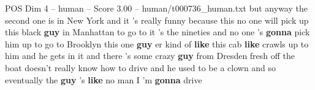 \begin{textsample}{POS Dim 4 – human – Score 3.00 – human/t000736\_human.txt}  \label{ex:f4_pos_016}
but anyway the second one is in New York and it 's really funny because this no one will pick up this black \textbf{guy} in Manhattan to go to it 's the nineties and no one 's \textbf{gonna} pick him up to go to Brooklyn this one \textbf{guy} er kind of \textbf{like} this cab \textbf{like} crawls up to him and he gets in it and there 's some crazy \textbf{guy} from Dresden fresh off the boat doesn't really know how to drive and he used to be a clown and so eventually the \textbf{guy} 's \textbf{like} no man I 'm \textbf{gonna} drive

\end{textsample}
